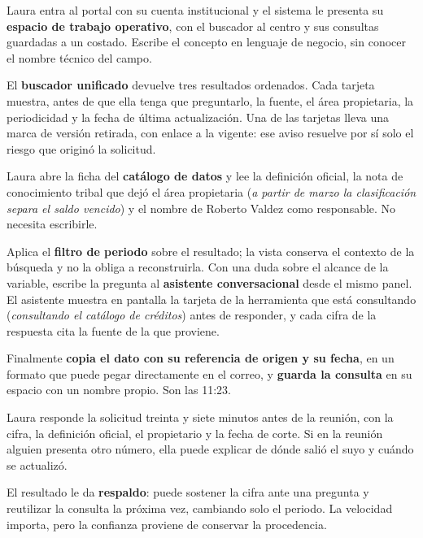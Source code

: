 
Laura entra al portal con su cuenta institucional y el sistema le presenta su
\textbf{espacio de trabajo operativo}, con el buscador al centro y sus consultas guardadas a
un costado. Escribe el concepto en lenguaje de negocio, sin conocer el nombre técnico del
campo.

El \textbf{buscador unificado} devuelve tres resultados ordenados. Cada tarjeta muestra, antes
de que ella tenga que preguntarlo, la fuente, el área propietaria, la periodicidad y la fecha
de última actualización. Una de las tarjetas lleva una marca de versión retirada, con enlace
a la vigente: ese aviso resuelve por sí solo el riesgo que originó la solicitud.

Laura abre la ficha del \textbf{catálogo de datos} y lee la definición oficial, la nota de
conocimiento tribal que dejó el área propietaria (\emph{a partir de marzo la clasificación
separa el saldo vencido}) y el nombre de Roberto Valdez como responsable. No necesita
escribirle.

Aplica el \textbf{filtro de periodo} sobre el resultado; la vista conserva el contexto de la
búsqueda y no la obliga a reconstruirla. Con una duda sobre el alcance de la variable, escribe
la pregunta al \textbf{asistente conversacional} desde el mismo panel. El asistente muestra en
pantalla la tarjeta de la herramienta que está consultando (\emph{consultando el catálogo de
créditos}) antes de responder, y cada cifra de la respuesta cita la fuente de la que
proviene.

Finalmente \textbf{copia el dato con su referencia de origen y su fecha}, en un formato que
puede pegar directamente en el correo, y \textbf{guarda la consulta} en su espacio con un
nombre propio. Son las 11:23.


Laura responde la solicitud treinta y siete minutos antes de la reunión, con la cifra, la
definición oficial, el propietario y la fecha de corte. Si en la reunión alguien presenta otro
número, ella puede explicar de dónde salió el suyo y cuándo se actualizó.

El resultado le da \textbf{respaldo}: puede sostener la cifra ante una pregunta y reutilizar
la consulta la próxima vez, cambiando solo el periodo. La velocidad importa, pero la confianza
proviene de conservar la procedencia.

